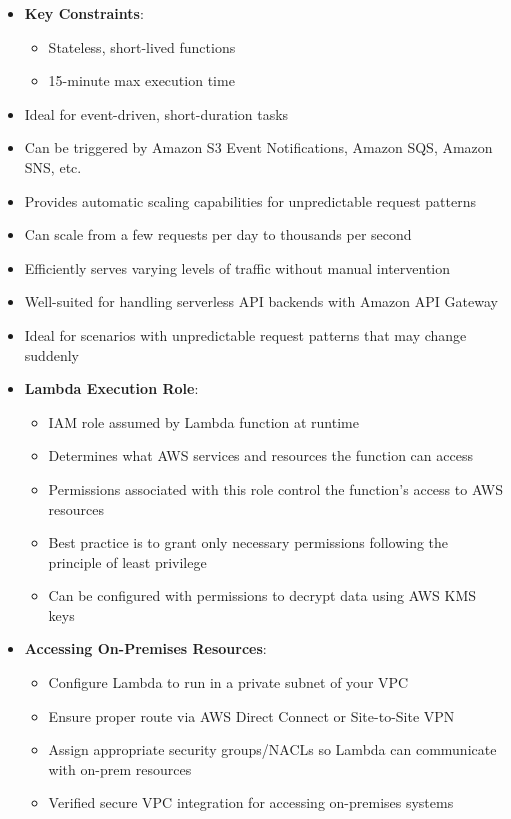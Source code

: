 \documentclass[11pt,a4paper]{report}
\begin{document}
\begin{itemize}
  \item \textbf{Key Constraints}:
\begin{itemize}
  \item Stateless, short-lived functions
  \item 15-minute max execution time
\end{itemize}
  \item Ideal for event-driven, short-duration tasks
  \item Can be triggered by Amazon S3 Event Notifications, Amazon SQS, Amazon SNS, etc.
  \item Provides automatic scaling capabilities for unpredictable request patterns
  \item Can scale from a few requests per day to thousands per second
  \item Efficiently serves varying levels of traffic without manual intervention
  \item Well-suited for handling serverless API backends with Amazon API Gateway
  \item Ideal for scenarios with unpredictable request patterns that may change suddenly
  \item \textbf{Lambda Execution Role}:
\begin{itemize}
  \item IAM role assumed by Lambda function at runtime
  \item Determines what AWS services and resources the function can access
  \item Permissions associated with this role control the function's access to AWS resources
  \item Best practice is to grant only necessary permissions following the principle of least privilege
  \item Can be configured with permissions to decrypt data using AWS KMS keys
\end{itemize}
  \item \textbf{Accessing On-Premises Resources}:
\begin{itemize}
  \item Configure Lambda to run in a private subnet of your VPC
  \item Ensure proper route via AWS Direct Connect or Site-to-Site VPN
  \item Assign appropriate security groups/NACLs so Lambda can communicate with on-prem resources
  \item Verified secure VPC integration for accessing on-premises systems

\end{itemize}
\end{itemize}
\end{document}
